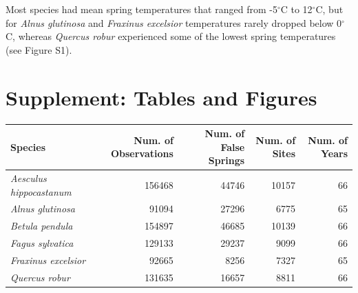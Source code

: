 \documentclass{article}\usepackage[]{graphicx}\usepackage[]{color}
\begin{document}
Most species had mean spring temperatures that ranged from -5$^{\circ}$C to 12$^{\circ}$C, but for \textit{Alnus glutinosa} and \textit{Fraxinus excelsior} temperatures rarely dropped below 0$^{\circ}$C, whereas \textit{Quercus robur} experienced some of the lowest spring temperatures (see Figure S1). 

\newpage
\nocite{NPN2019}


\newpage
\section*{Supplement: Tables and Figures}
  
\begin{center}
 \label{tab:spp} 
\begin{tabular}{l r r r r}
\hline
Species & Num. of Observations & Num. of False Springs & Num. of Sites & Num. of Years \\
\hline
\textit{Aesculus hippocastanum} & 156468 & 44746 & 10157 & 66  \\
\textit{Alnus glutinosa} & 91094 & 27296 & 6775 & 65 \\
\textit{Betula pendula} & 154897 & 46685 & 10139 & 66 \\
\textit{Fagus sylvatica} & 129133 & 29237 & 9099 & 66 \\
\textit{Fraxinus excelsior} & 92665 & 8256 & 7327 & 65 \\
\textit{Quercus robur} & 131635 & 16657 & 8811 & 66 \\
\hline
\end{tabular}
\end{center}

\vspace{15ex}
\end{document}
